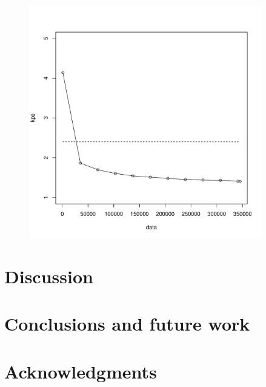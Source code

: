\documentclass{llncs}
\begin{document}
\begin{figure}[hbt!]
\includegraphics[width=4in]{finnish_kpc_figure.pdf}
\end{figure}

\section{Discussion}\label{discussion}

\section{Conclusions and future work}\label{conclusion}

\section{Acknowledgments}



\end{document}
